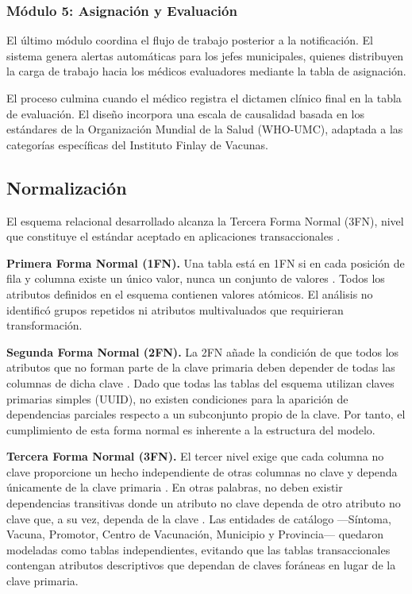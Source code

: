 \subsubsection{Módulo 5: Asignación y Evaluación}
El último módulo coordina el flujo de trabajo posterior a la notificación. 
El sistema genera alertas automáticas para los jefes municipales, quienes distribuyen la carga de trabajo hacia los médicos evaluadores mediante la tabla de asignación. 

El proceso culmina cuando el médico registra el dictamen clínico final en la tabla de evaluación. 
El diseño incorpora una escala de causalidad basada en los estándares de la Organización Mundial de la Salud (WHO-UMC), adaptada a las categorías específicas del Instituto Finlay de Vacunas. 




\subsection{Normalización}
El esquema relacional desarrollado alcanza la Tercera Forma Normal (3FN), nivel que constituye el estándar aceptado en aplicaciones transaccionales \cite{date2012}.

\textbf{Primera Forma Normal (1FN).} Una tabla está en 1FN si en cada posición de fila y columna existe un único valor, nunca un conjunto de valores \cite{ibm-admin-guide}. 
Todos los atributos definidos en el esquema contienen valores atómicos. 
El análisis no identificó grupos repetidos ni atributos multivaluados que requirieran transformación.

\textbf{Segunda Forma Normal (2FN).} La 2FN añade la condición de que todos los atributos que no forman parte de la clave primaria deben depender de todas las columnas de dicha clave  \cite{ibm-admin-guide}. 
Dado que todas las tablas del esquema utilizan claves primarias simples (UUID), no existen condiciones para la aparición de dependencias parciales respecto a un subconjunto propio de la clave. 
Por tanto, el cumplimiento de esta forma normal es inherente a la estructura del modelo.

\textbf{Tercera Forma Normal (3FN).}  El tercer nivel exige que cada columna no clave proporcione un hecho independiente de otras columnas no clave y dependa únicamente de la clave primaria \cite{ibm-admin-guide}. 
En otras palabras, no deben existir dependencias transitivas donde un atributo no clave dependa de otro atributo no clave que, a su vez, dependa de la clave \cite{ibm-third-normal-form}. 
Las entidades de catálogo —Síntoma, Vacuna, Promotor, Centro de Vacunación, Municipio y Provincia— quedaron modeladas como tablas independientes, evitando que las tablas transaccionales contengan atributos descriptivos que dependan de claves foráneas en lugar de la clave primaria.

